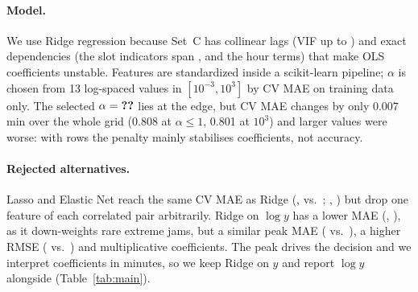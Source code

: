 \paragraph{Model.} We use Ridge regression \citep{hoerl1970} because Set~C has collinear lags (VIF
up to ) and exact dependencies (the slot indicators span
,  and the hour terms) that make OLS coefficients unstable.
Features are standardized inside a scikit-learn pipeline; $\alpha$ is chosen from 13 log-spaced
values in $[10^{-3},10^{3}]$ by CV MAE on training data only. The selected $\alpha=\res{sel.alphaC}$
lies at the edge, but CV MAE changes by only 0.007\,min over the whole grid (0.808 at
$\alpha\leq 1$, 0.801 at $10^{3}$) and larger values were worse: with  rows the
penalty mainly stabilises coefficients, not accuracy.

\paragraph{Rejected alternatives.} Lasso and Elastic Net reach the same CV MAE as Ridge
(,  vs.\ ; ,
) but drop one feature of each correlated pair arbitrarily. Ridge on $\log y$
has a lower MAE (, ), as it down-weights rare extreme jams,
but a similar peak MAE ( vs.\ ), a higher RMSE
( vs.\ ) and multiplicative coefficients. The peak drives the
decision and we interpret coefficients in minutes, so we keep Ridge on $y$ and report $\log y$
alongside (Table~\ref{tab:main}).
